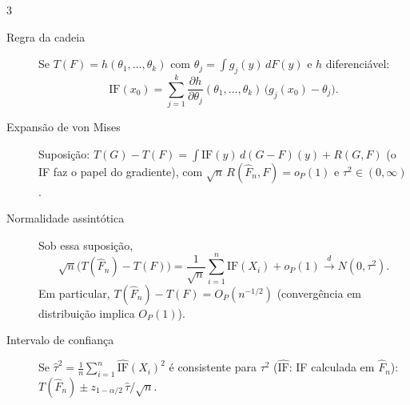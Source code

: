 \documentclass[10pt,landscape]{article}
\newcommand{\IF}{\textrm{IF}}
\newcommand{\Fn}{\hat{F}_n}
\newcommand{\dto}{\xrightarrow{d}}
\begin{document}
\begin{multicols}{3}
\begin{description}
  \item[Regra da cadeia] Se $T(F)=h(\theta_1,\dots,\theta_k)$ com $\theta_j=\int g_j(y)\,dF(y)$ e $h$ diferenciável:
  \[\IF(x_0)=\sum_{j=1}^k\frac{\partial h}{\partial\theta_j}(\theta_1,\dots,\theta_k)\,\big(g_j(x_0)-\theta_j\big).\]
  \item[Expansão de von Mises] Suposição: $T(G)-T(F)=\int\IF(y)\,d(G-F)(y)+R(G,F)$ (o IF faz o papel do gradiente), com $\sqrt n\,R(\Fn,F)=o_P(1)$ e $\tau^2\in(0,\infty)$.
  \item[Normalidade assintótica] Sob essa suposição,
  \[\sqrt n\big(T(\Fn)-T(F)\big)=\frac1{\sqrt n}\sum_{i=1}^n\IF(X_i)+o_P(1)\dto N(0,\tau^2).\]
  Em particular, $T(\Fn)-T(F)=O_P(n^{-1/2})$ (convergência em distribuição implica $O_P(1)$).
  \item[Intervalo de confiança] Se $\hat\tau^2=\frac1n\sum_{i=1}^n\widehat{\IF}(X_i)^2$ é consistente para $\tau^2$ ($\widehat{\IF}$: IF calculada em $\Fn$):
  \ $T(\Fn)\pm z_{1-\alpha/2}\,\hat\tau/\sqrt n$.
\end{description}


\end{multicols}
\end{document}
